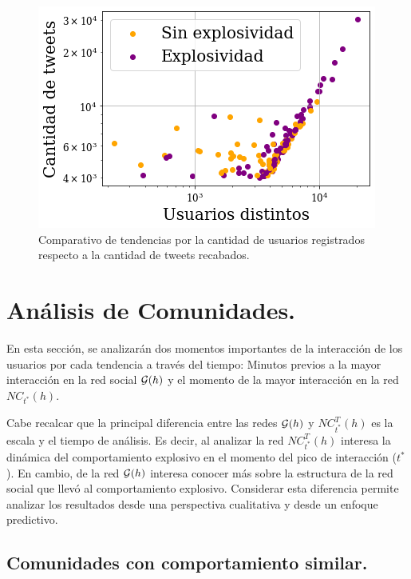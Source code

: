\documentclass[../main.tex]{subfiles}
\begin{document}
\begin{figure}[h!]
    \centering
    \includegraphics[scale = 0.8]{images/resultados_estadisticos.png}
    \caption{Comparativo de tendencias por la cantidad de usuarios registrados respecto a la cantidad de tweets recabados. }
    \label{fig:resultados_comparativotweetsusuarios}
\end{figure}

\section{Análisis de Comunidades.}

En esta sección, se analizarán dos momentos importantes de la interacción de los usuarios por cada tendencia a través del tiempo: Minutos previos a la mayor interacción en la red social $\mathcal{G}(h)$ y el momento de la mayor interacción en la red $NC_{t^{*}}(h)$. 


Cabe recalcar que la principal diferencia entre las redes $\mathcal{G}(h)$ y $NC^{T}_{t^{*}}(h)$ es la escala y el tiempo de análisis. Es decir, al analizar la red $NC^{T}_{t^{*}}(h)$ interesa la dinámica del comportamiento explosivo en el momento del pico de interacción ($t^{*}$). En cambio, de la red $\mathcal{G}(h)$ interesa conocer más sobre la estructura de la red social que llevó al comportamiento explosivo. Considerar esta diferencia permite analizar los resultados desde una perspectiva cualitativa y desde un enfoque predictivo.


\subsection{Comunidades con comportamiento similar.}
\end{document}
